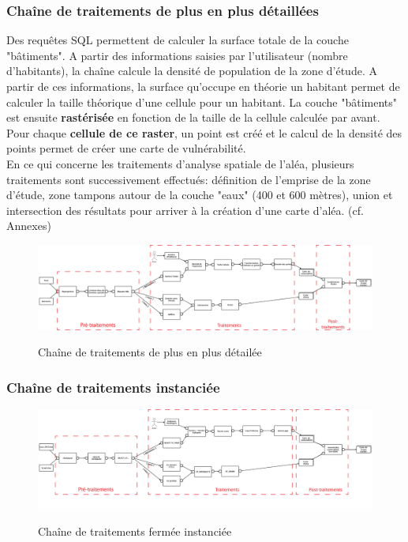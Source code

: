 \subsubsection{Chaîne de traitements de plus en plus détaillées}

Des requêtes SQL permettent de calculer la surface totale de la couche "bâtiments". A partir des informations saisies par l'utilisateur (nombre d'habitants), la chaîne calcule la densité de population de la zone d'étude. A partir de ces informations, la surface qu'occupe en théorie un habitant permet de calculer la taille théorique d'une cellule pour un habitant. La couche "bâtiments" est ensuite \textbf{rastérisée} en fonction de la taille de la cellule calculée par avant. Pour chaque \textbf{cellule de ce raster}, un point est créé et le calcul de la densité des points permet de créer une carte de vulnérabilité.\\

En ce qui concerne les traitements d'analyse spatiale de l'aléa, plusieurs traitements sont successivement effectués: définition de l'emprise de la zone d'étude, zone tampons autour de la couche "eaux" (400 et 600 mètres), union et intersection des résultats pour arriver à la création d'une carte d'aléa. (cf. Annexes)\\


\begin{figure}[H]
\begin{center}

\includegraphics[width=15cm]{Traitement4.png}\\
\caption{\label{Traitement14} Chaîne de traitements de plus en plus détailée}
\end{center}
\end{figure}

\subsubsection{Chaîne de traitements instanciée}


\begin{figure}[H]
\begin{center}

\includegraphics[width=15cm]{chaineinstanc.png}\\
\caption{\label{traitementsInstancie} Chaîne de traitements fermée instanciée}
\end{center}
\end{figure}

